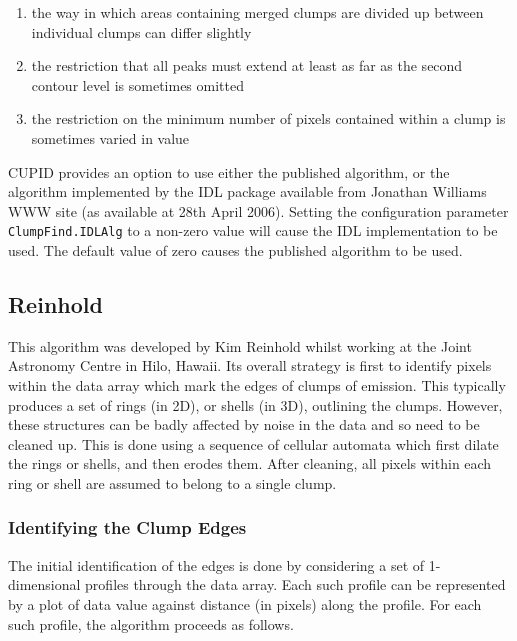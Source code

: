 \documentclass[twoside,11pt]{starlink}
\begin{document}
\begin{enumerate}

\item the way in which areas containing merged clumps are divided up between
individual clumps can differ slightly

\item the restriction that all peaks must extend at least as far as the
second contour level is sometimes omitted

\item the restriction on the minimum number of pixels contained within a
clump is sometimes varied in value

\end{enumerate}

CUPID provides an option to use either the published algorithm, or the
algorithm implemented by the IDL package available from Jonathan Williams
WWW site (as available at 28th April 2006). Setting the configuration
parameter \texttt{ClumpFind.IDLAlg} to a non-zero value will cause the IDL
implementation to be used. The default value of zero causes the published
algorithm to be used.


\subsection{Reinhold}
This algorithm was developed by Kim Reinhold whilst working at the Joint
Astronomy Centre in Hilo, Hawaii. Its overall strategy is first to
identify pixels within the data array which mark the edges of clumps of
emission. This typically produces a set of rings (in 2D), or shells (in 3D),
outlining the clumps. However, these structures can be badly affected by
noise in the data and so need to be cleaned up. This is done using a
sequence of cellular automata which first dilate the rings or shells, and
then erodes them. After cleaning, all pixels within each ring or shell
are assumed to belong to a single clump.

\subsubsection{Identifying the Clump Edges}
The initial identification of the edges is done by considering a set of
1-dimensional profiles through the data array. Each such profile can be
represented by a plot of data value against distance (in pixels) along the
profile. For each such profile, the algorithm proceeds as follows.
\end{document}
